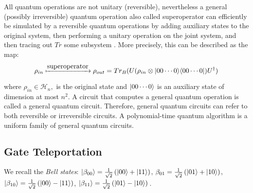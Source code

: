 All quantum operations are not unitary (reversible), nevertheless a general (possibly irreversible) quantum operation also called superoperator can efficiently be simulated by a reversible quantum operations by adding auxiliary states to the original system, then performing a unitary operation on the joint system, and then tracing out $Tr$ some subsystem \cite{KLM07}. More precisely, this can be described as the map:
$$\rho_{in} \xmapsto{\mbox{superoperator}} \rho_{out}=Tr_B(U(\rho_{in} \otimes {\lvert}00\cdots 0\rangle {\langle}00\cdots 0\rvert)U^\dagger)$$

where $\rho_{in} \in \mathcal{H}_n,$ is the original state and ${\lvert}00\cdots 0\rangle$ is an auxiliary state of dimension at most $n^2.$ A circuit that computes a general quantum operation is called a general quantum circuit.  Therefore, general quantum circuits can refer to both reversible or irreversible circuits. A polynomial-time quantum algorithm is a uniform family of general quantum circuits. \\









\subsection{Gate Teleportation}
\label{protocol: gate-teleportation}

We recall the \emph{Bell states}: %
${\lvert}\beta_{00}\rangle=\frac{1}{\sqrt2}\left({\lvert}00\rangle+{\lvert}11\rangle\right)$, ${\beta_{01}}=\frac{1}{\sqrt2}\left({\lvert}01\rangle+{\lvert}10\rangle\right)$,
${\lvert}\beta_{10}\rangle=\frac{1}{\sqrt2}\left({\lvert}00\rangle-{\lvert}11\rangle\right)$,  ${\lvert}\beta_{11}\rangle=\frac{1}{\sqrt2}\left({\lvert}01\rangle-{\lvert}10\rangle\right)$\,. 

